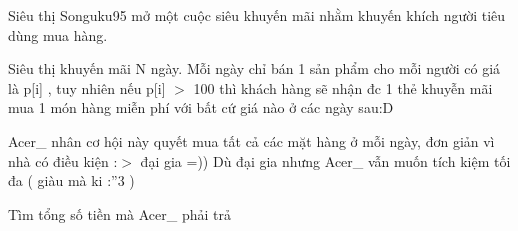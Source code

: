Siêu thị Songuku95 mở một cuộc siêu khuyến mãi nhằm khuyến khích người tiêu dùng mua hàng.

Siêu thị khuyến mãi N ngày. Mỗi ngày chỉ bán 1 sản phẩm cho mỗi người có giá là p[i] , tuy nhiên nếu p[i] $>$ 100 thì khách hàng sẽ nhận đc 1 thẻ khuyễn mãi mua 1 món hàng miễn phí với bất cứ giá nào ở các ngày sau:D

Acer\_ nhân cơ hội này quyết mua tất cả các mặt hàng ở mỗi ngày, đơn giản vì nhà có điều kiện :$>$ đại gia =)) Dù đại gia nhưng Acer\_ vẫn muốn tích kiệm tối đa ( giàu mà ki :”3 )

Tìm tổng số tiền mà Acer\_ phải trả